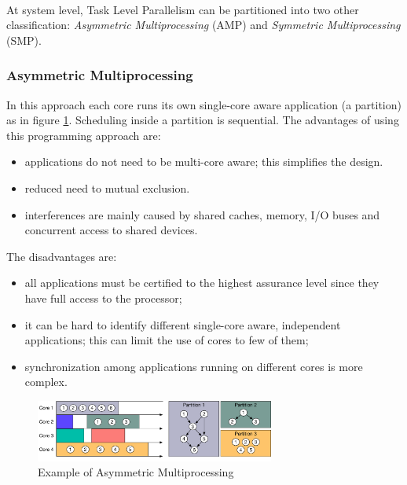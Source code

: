 \paragraph{} At system level, Task Level Parallelism can be partitioned into two other classification: \emph{Asymmetric Multiprocessing} (AMP) and \emph{Symmetric Multiprocessing} (SMP).

\subsubsection{Asymmetric Multiprocessing}
In this approach each core runs its own single-core aware application (a partition) as in figure \ref{fig:AMP}. Scheduling inside a partition is sequential. The advantages of using this programming approach are:
\begin{itemize}
\item applications do not need to be multi-core aware; this simplifies the design.
\item reduced need to mutual exclusion.
\item interferences are mainly caused by shared caches, memory, I/O buses and concurrent access to shared devices.
\end{itemize}
The disadvantages are:
\begin{itemize}
\item all applications must be certified to the highest assurance level since they have full access to the processor;
\item it can be hard to identify different single-core aware, independent applications; this can limit the use of cores to few of them;
\item synchronization among applications running on different cores is more complex.
\end{itemize}

\begin{figure}[htbp]
  \centering
  \includegraphics[width=0.7\textwidth]{AMP}
  \caption{Example of Asymmetric Multiprocessing}
  \label{fig:AMP}
\end{figure}

